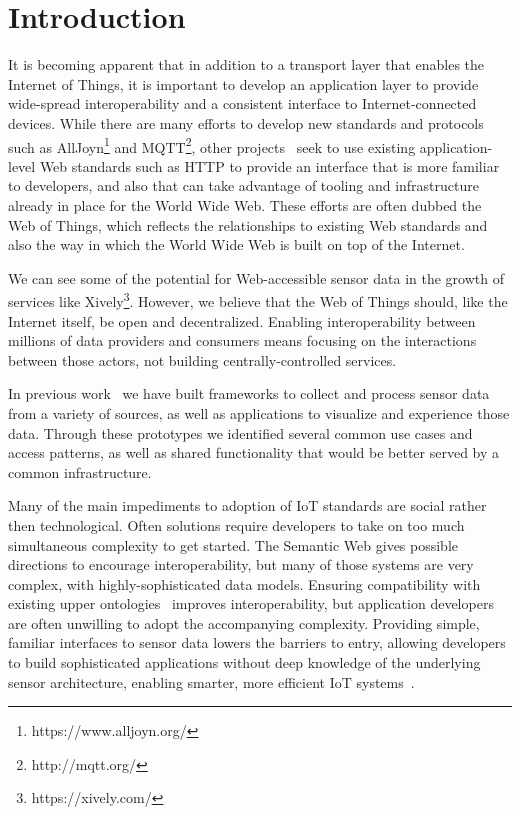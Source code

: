 \documentclass{acm_proc_article-sp}
\begin{document}
\section{Introduction}

It is becoming apparent that in addition to a transport layer that enables the
Internet of Things, it is important to develop an application layer to provide
wide-spread interoperability and a consistent interface to Internet-connected
devices. While there are many efforts to develop new standards and
protocols such as AllJoyn\footnote{https://www.alljoyn.org/} and
MQTT\footnote{http://mqtt.org/}, other projects~\cite{guinard2010} seek to
use existing application-level Web standards such as HTTP to provide an
interface that is more familiar to developers, and also that can take advantage
of tooling and infrastructure already in place for the World Wide Web.
These efforts are often dubbed the Web of Things, which reflects the
relationships to existing Web standards and also the way in which the World
Wide Web is built on top of the Internet.

We can see some of the potential for Web-accessible sensor data in the growth
of services like Xively\footnote{https://xively.com/}. However, we believe that
the Web of Things should, like the Internet itself, be open and decentralized.
Enabling interoperability between millions of data providers and consumers
means focusing on the interactions between those actors, not building
centrally-controlled services.

In previous work~\cite{doppellab}\cite{gestures} we have built frameworks to collect
and process sensor data from a variety of sources, as well as applications to
visualize and experience those data. Through these prototypes we identified
several common use cases and access patterns, as well as shared functionality
that would be better served by a common infrastructure.

Many of the main impediments to adoption of IoT standards are social rather
then technological. Often solutions require developers to take on too much
simultaneous complexity to get started. The Semantic Web gives possible
directions to encourage interoperability, but many of those systems are very
complex, with highly-sophisticated data models. Ensuring compatibility with
existing upper ontologies~\cite{w3contology}\cite{broring2011}\cite{eid2007}
improves interoperability, but application developers are often unwilling to
adopt the accompanying complexity. Providing simple, familiar interfaces to
sensor data lowers the barriers to entry, allowing developers to build
sophisticated applications without deep knowledge of the underlying sensor
architecture, enabling smarter, more efficient IoT systems~\cite{aldrich2013}.
\end{document}
